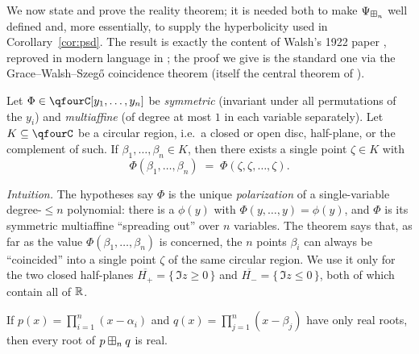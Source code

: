 \smallskip
We now state and prove the reality theorem; it is needed both to make
$\Psi_{\boxplus_n}$ well defined and, more essentially, to supply the hyperbolicity
used in Corollary~\ref{cor:psd}. The result is exactly the content of Walsh's
1922 paper \cite{Walsh}, reproved in modern language in \cite{MSS22}; the proof
we give is the standard one via the Grace--Walsh--Szeg\H{o} coincidence theorem
(itself the central theorem of \cite{Walsh}).

\begin{qfourtheorem}\label{thm:gws}
Let $\Phi\in\qfourC[y_1,\dots,y_n]$ be \emph{symmetric} (invariant under all
permutations of the $y_i$) and \emph{multiaffine} (of degree at most $1$ in each
variable separately). Let $K\subseteq\qfourC$ be a circular region, i.e.\ a
closed or open disc, half-plane, or the complement of such. If
$\beta_1,\dots,\beta_n\in K$, then there exists a single point $\zeta\in K$ with
\[
\Phi(\beta_1,\dots,\beta_n)\;=\;\Phi(\zeta,\zeta,\dots,\zeta).
\]
\end{qfourtheorem}

\noindent\emph{Intuition.} The hypotheses say $\Phi$ is the unique
\emph{polarization} of a single-variable degree-$\le n$ polynomial: there is a
$\phi(y)$ with $\Phi(y,\dots,y)=\phi(y)$, and $\Phi$ is its symmetric
multiaffine ``spreading out'' over $n$ variables. The theorem says that, as far
as the value $\Phi(\beta_1,\dots,\beta_n)$ is concerned, the $n$ points
$\beta_i$ can always be ``coincided'' into a single point $\zeta$ of the same
circular region. We use it only for the two closed half-planes
$\overline{H_+}=\{\,\Im z\ge0\,\}$ and $\overline{H_-}=\{\,\Im z\le0\,\}$, both of
which contain all of $\mathbb{R}$.

\begin{qfourlemma}\label{lem:walsh}
If $p(x)=\prod_{i=1}^n(x-\alpha_i)$ and $q(x)=\prod_{j=1}^n(x-\beta_j)$ have only
real roots, then every root of $p\boxplus_n q$ is real.
\end{qfourlemma}

